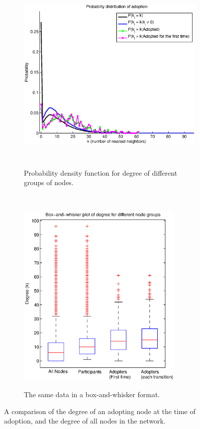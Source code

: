 \documentclass[12pt]{article}
\begin{document}
\begin{figure}[H]
    \begin{subfigure}[b]{.6\textwidth}
\includegraphics[trim = 2cm 0cm 0cm 0cm, height = 9cm]{Graficos/PkGivenAdopt.eps}
\label{fig:PkgA}
\caption{Probability density function for degree of different groups of nodes.}
    \end{subfigure}
    ~
    \begin{subfigure}[b]{.4\textwidth}
\includegraphics[trim = .5cm 1.4cm 0cm 0cm, height =9cm]{Graficos/PkGivenAdoptBox.eps}
\label{fig:PkGivenAdoptBox}
\caption{The same data in a box-and-whisker format.}
    \end{subfigure}
    \caption{A comparison of the degree of an adopting node at the time of adoption, and the degree of all nodes in the network.}
        \label{fig:PkgA}
\end{figure}
\end{document}
